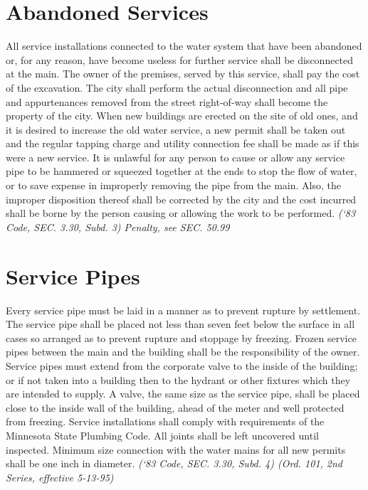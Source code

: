 \documentclass[code.tex]{subfiles}
\begin{document}
\section{Abandoned Services}
All service installations connected to the water system that have been abandoned or, for any reason, have become useless for further service shall be disconnected at the main.  The owner of the premises, served by this service, shall pay the cost of the excavation.  The city shall perform the actual disconnection and all pipe and appurtenances removed from the street right-of-way shall become the property of the city.  When new buildings are erected on the site of old ones, and it is desired to increase the old water service, a new permit shall be taken out and the regular tapping charge and utility connection fee shall be made as if this were a new service.  It is unlawful for any person to cause or allow any service pipe to be hammered or squeezed together at the ends to stop the flow of water, or to save expense in improperly removing the pipe from the main.  Also, the improper disposition thereof shall be corrected by the city and the cost incurred shall be borne by the person causing or allowing the work to be performed.\newline
\emph{(‘83 Code, SEC. 3.30, Subd. 3)  Penalty, see SEC. 50.99}
\section{Service Pipes}
Every service pipe must be laid in a manner as to prevent rupture by settlement.  The service pipe shall be placed not less than seven feet below the surface in all cases so arranged as to prevent rupture and stoppage by freezing.  Frozen service pipes between the main and the building shall be the responsibility of the owner.  Service pipes must extend from the corporate valve to the inside of the building; or if not taken into a building then to the hydrant or other fixtures which they are intended to supply.  A valve, the same size as the service pipe, shall be placed close to the inside wall of the building, ahead of the meter and well protected from freezing.  Service installations shall comply with requirements of the Minnesota State Plumbing Code.  All joints shall be left uncovered until inspected.  Minimum size connection with the water mains for all new permits shall be one inch in diameter.\newline
\emph{(‘83 Code, SEC. 3.30, Subd. 4) (Ord. 101, 2nd Series, effective 5-13-95)}
\end{document}
